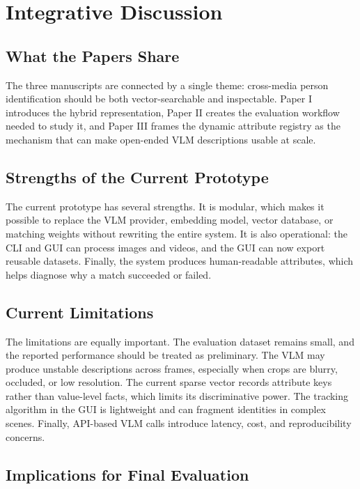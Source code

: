 \chapter{Integrative Discussion}
\label{ch:integrative-discussion}

\section{What the Papers Share}

The three manuscripts are connected by a single theme: cross-media person identification should be both vector-searchable and inspectable. Paper I introduces the hybrid representation, Paper II creates the evaluation workflow needed to study it, and Paper III frames the dynamic attribute registry as the mechanism that can make open-ended VLM descriptions usable at scale.

\section{Strengths of the Current Prototype}

The current prototype has several strengths. It is modular, which makes it possible to replace the VLM provider, embedding model, vector database, or matching weights without rewriting the entire system. It is also operational: the CLI and GUI can process images and videos, and the GUI can now export reusable datasets. Finally, the system produces human-readable attributes, which helps diagnose why a match succeeded or failed.

\section{Current Limitations}

The limitations are equally important. The evaluation dataset remains small, and the reported performance should be treated as preliminary. The VLM may produce unstable descriptions across frames, especially when crops are blurry, occluded, or low resolution. The current sparse vector records attribute keys rather than value-level facts, which limits its discriminative power. The tracking algorithm in the GUI is lightweight and can fragment identities in complex scenes. Finally, API-based VLM calls introduce latency, cost, and reproducibility concerns.

\section{Implications for Final Evaluation}


